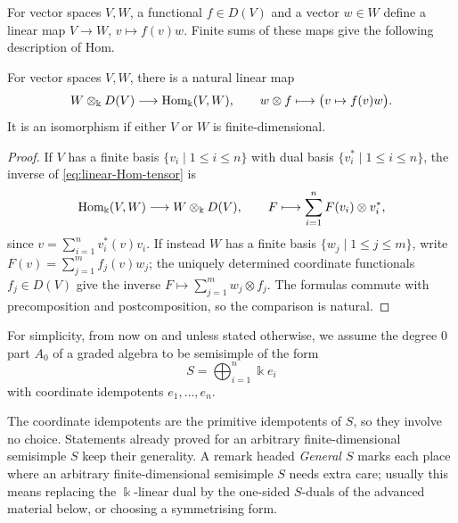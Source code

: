 For vector spaces $V,W$, a functional $f\in D(V)$ and a vector $w\in W$ define a linear map $V\to W$, $v\mapsto f(v)w$.
Finite sums of these maps give the following description of Hom.

\begin{proposition}\label{prop:linear-Hom-tensor}
For vector spaces $V,W$, there is a natural linear map
\begin{equation}\label{eq:linear-Hom-tensor}
W\otimes_\Bbbk D(V)\longrightarrow\operatorname{Hom}\nolimits_\Bbbk(V,W),
\qquad w\otimes f\longmapsto\bigl(v\mapsto f(v)w\bigr).
\end{equation}
It is an isomorphism if either $V$ or $W$ is finite-dimensional.
\end{proposition}

\begin{supplementary}
\begin{proof}
If $V$ has a finite basis $\{v_i\mid 1\leq i\leq n\}$ with dual basis $\{v_i^*\mid 1\leq i\leq n\}$, the inverse of \eqref{eq:linear-Hom-tensor} is
\[
\operatorname{Hom}\nolimits_\Bbbk(V,W)\longrightarrow W\otimes_\Bbbk D(V),
\qquad F\longmapsto\sum_{i=1}^nF(v_i)\otimes v_i^*,
\]
since $v=\sum_{i=1}^n v_i^*(v)v_i$.
If instead $W$ has a finite basis $\{w_j\mid 1\leq j\leq m\}$, write $F(v)=\sum_{j=1}^m f_j(v)w_j$; the uniquely determined coordinate functionals $f_j\in D(V)$ give the inverse $F\mapsto\sum_{j=1}^m w_j\otimes f_j$.
The formulas commute with precomposition and postcomposition, so the comparison is natural.
\end{proof}
\end{supplementary}

\begin{assumption}\label{ass:basic-semisimple}
For simplicity, from now on and unless stated otherwise, we assume the degree $0$ part $A_0$ of a graded algebra to be semisimple of the form
\[
S=\bigoplus_{i=1}^n\Bbbk e_i
\]
with coordinate idempotents $e_1,\ldots,e_n$.
\end{assumption}

The coordinate idempotents are the primitive idempotents of $S$, so they involve no choice.
Statements already proved for an arbitrary finite-dimensional semisimple $S$ keep their generality.
A remark headed \emph{General $S$} marks each place where an arbitrary finite-dimensional semisimple $S$ needs extra care; usually this means replacing the $\Bbbk$-linear dual by the one-sided $S$-duals of the advanced material below, or choosing a symmetrising form.

